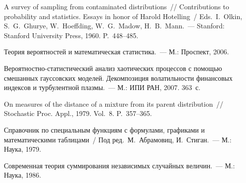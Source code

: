 \begin{multicols}{2}
{{\begin{thebibliography}{99}
 A survey of sampling from contaminated
distributions~// Contributions to probability and
statistics. Essays in honor of Harold Hotelling~/ Eds.\ I.~Olkin, S.~G.~Ghurye, W.~Hoeffding,
W.~G.~Madow, H.~B.~Mann.~--- Stanford: Stanford University Press, 1960. P.~448--485.

 Теория вероятностей и математическая
статистика.~--- М.: Проспект, 2006.


 Вероятностно-ста\-ти\-сти\-че\-ский анализ хаотических
процессов с помощью смешанных гауссовских моделей. Декомпозиция
волатильности финансовых индексов и турбулентной плазмы.~--- М.: ИПИ
РАН, 2007. 363~с.

 On measures of
the distance of a mixture from its parent distribution~//
Stochastic Proc. Appl., 1979. Vol.~8. P.~357--365.

Справочник
по специальным функциям с формулами, графиками и математическими
таблицами~/ Под ред.\ М.~Абрамовиц, И.~Стиган.~--- М.: Наука, 1979.


 \label{end\stat}
 
 Современная теория суммирования независимых
случайных величин.~--- М.: Наука, 1986.


 \end{thebibliography}
}
}


\end{multicols}  